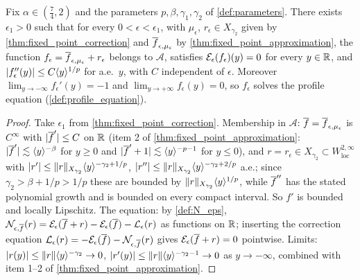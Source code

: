 \begin{lemma}
  \label{lem:c01_profile_from_correction}
  Fix $\alpha\in(\frac74,2)$ and the parameters $p,\beta,\gamma_1,\gamma_2$ of \cref{def:parameters}.
  There exists $\epsilon_1>0$ such that for every $0<\epsilon<\epsilon_1$, with $\mu_\epsilon$,
  $r_\epsilon\in X_{\gamma_2}$ given by \cref{thm:fixed_point_correction} and
  $\overline{f}_{\epsilon,\mu_\epsilon}$ by \cref{thm:fixed_point_approximation}, the function
  $f_\epsilon=\overline{f}_{\epsilon,\mu_\epsilon}+r_\epsilon$ belongs to $\mathcal A$, satisfies
  $\mathcal{E}_\epsilon(f_\epsilon)(y)=0$ for every $y\in\mathbb{R}$, and
  $|f_\epsilon''(y)|\le C\langle y \rangle^{1/p}$ for a.e.\ $y$, with $C$ independent of $\epsilon$.
  Moreover $\lim_{y\to-\infty}f_\epsilon'(y)=-1$ and $\lim_{y\to+\infty}f_\epsilon(y)=0$, so
  $f_\epsilon$ solves the profile equation (\cref{def:profile_equation}).
\end{lemma}
\begin{proof}
  Take $\epsilon_1$ from \cref{thm:fixed_point_correction}.  Membership in $\mathcal A$:
  $\overline{f}=\overline{f}_{\epsilon,\mu_\epsilon}$ is $C^\infty$ with $|\overline{f}'|\le C$ on $\mathbb{R}$ (item 2 of
  \cref{thm:fixed_point_approximation}: $|\overline{f}'|\lesssim\langle y \rangle^{-\beta}$ for $y\ge0$ and
  $|\overline{f}'+1|\lesssim\langle y \rangle^{-p-1}$ for $y\le0$), and $r=r_\epsilon\in X_{\gamma_2}\subset
  W^{2,\infty}_{\mathrm{loc}}$ with $|r'|\le\|r\|_{X_{\gamma_2}}\langle y \rangle^{-\gamma_2+1/p}$,
  $|r''|\le\|r\|_{X_{\gamma_2}}\langle y \rangle^{-\gamma_2+2/p}$ a.e.; since $\gamma_2>\beta+1/p>1/p$
  these are bounded by $\|r\|_{X_{\gamma_2}}\langle y \rangle^{1/p}$, while $\overline{f}''$ has the stated
  polynomial growth and is bounded on every compact interval. So
  $f'$ is bounded and locally Lipschitz.
  The equation: by \cref{def:N_eps},
  $\mathcal{N}_{\epsilon,\overline{f}}(r)=\mathcal{E}_\epsilon(\overline{f}+r)-\mathcal{E}_\epsilon(\overline{f})-\mathcal{L}_\epsilon(r)$ as functions on
  $\mathbb{R}$; inserting the correction equation $\mathcal{L}_\epsilon(r)=-\mathcal{E}_\epsilon(\overline{f})-\mathcal{N}_{\epsilon,\overline{f}}(r)$
  gives $\mathcal{E}_\epsilon(\overline{f}+r)=0$ pointwise.  Limits: $|r(y)|\le\|r\|\langle y \rangle^{-\gamma_2}\to0$,
  $|r'(y)|\le\|r\|\langle y \rangle^{-\gamma_2-1}\to0$ as $y\to-\infty$, combined with item 1--2 of
  \cref{thm:fixed_point_approximation}.
\end{proof}

